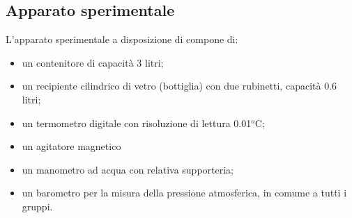 \subsection{Apparato sperimentale}
L'apparato sperimentale a disposizione di compone di:

\begin{itemize}
	\item{un contenitore di capacità 3 litri;}
	\item{un recipiente cilindrico di vetro (bottiglia) con due rubinetti, capacità 0.6 litri;}
	\item{un termometro digitale con risoluzione di lettura 0.01$^o$C;}
	\item{un agitatore magnetico}
	\item{un manometro ad acqua con relativa supporteria;}
	\item{un barometro per la misura della pressione atmosferica, in comume a tutti i gruppi.}
\end{itemize}

